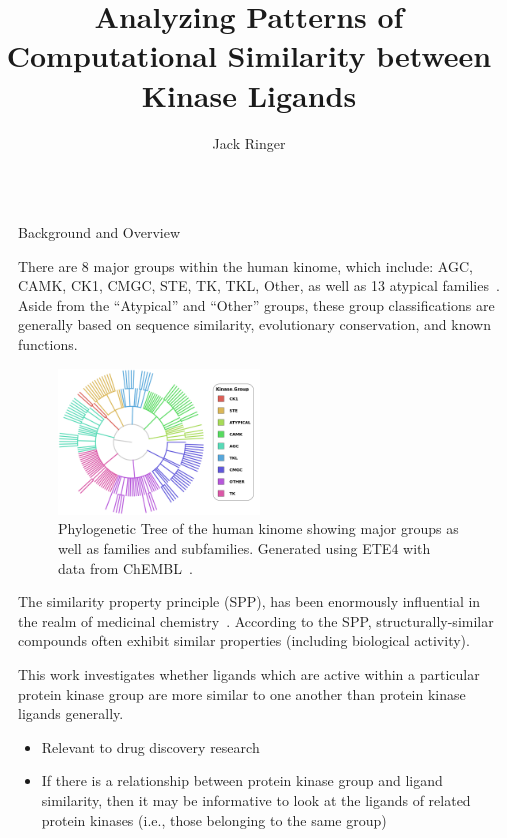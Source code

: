 \documentclass[final]{beamer}
\title{Analyzing Patterns of Computational Similarity between Kinase Ligands}
\author{Jack Ringer}
\institute[shortinst]{University of New Mexico}
\newlength{\sepwidth}
\newlength{\colwidth}
\newcommand{\separatorcolumn}{\begin{column}{\sepwidth}\end{column}}
\begin{document}
\begin{frame}[t]
\begin{columns}[t]
\separatorcolumn

\begin{column}{\colwidth}

  \begin{block}{Background and Overview}
   \small

 There are 8 major groups within the human kinome, which include: AGC, CAMK, CK1, CMGC, STE, TK, TKL, Other, as well as 13 atypical families~\cite{eid_turk_volkamer_rippmann_fulle_2017, manning_2002}. Aside from the ``Atypical'' and ``Other'' groups, these group classifications are generally based on sequence similarity, evolutionary conservation, and known functions. 

\begin{figure}[H]
    \centering
    \includegraphics[width=0.5\textwidth]{../figures/protein_family_tree.png}
    \caption{Phylogenetic Tree of the human kinome showing major groups as well as families and subfamilies. Generated using ETE4 with data from ChEMBL~\cite{chembl_db_2023}.}
    \label{fig:fam_tree}
\end{figure}

The similarity property principle (SPP), has been enormously influential in the realm of medicinal chemistry~\cite{maggiora_vogt_stumpfe_bajorath_2013}. According to the SPP, structurally-similar compounds often exhibit similar properties (including biological activity). 

This work investigates whether ligands which are active within a particular protein kinase group are more similar to one another than protein kinase ligands generally. 
    \begin{itemize}
        \item Relevant to drug discovery research
        \item If there is a relationship between protein kinase group and ligand similarity, then it may be informative to look at the ligands of related protein kinases (i.e., those belonging to the same group)
    \end{itemize}


\end{block}
\end{column}
\end{columns}
\end{frame}
\end{document}
